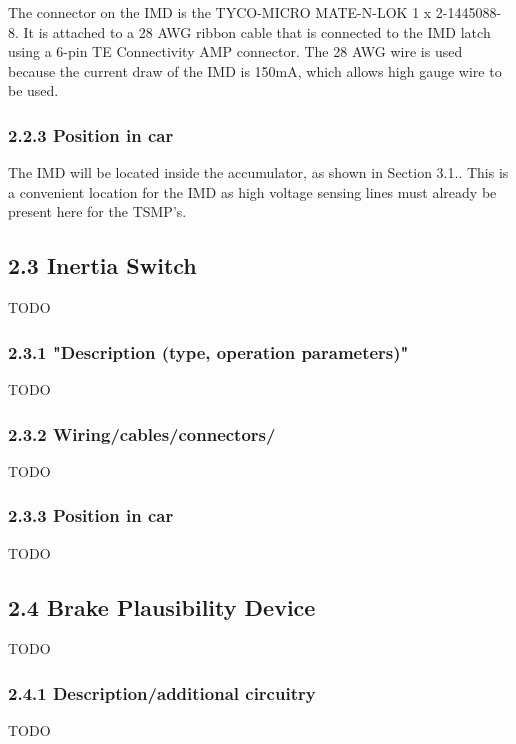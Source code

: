 \documentclass{article}
\begin{document}
The connector on the IMD is the TYCO-MICRO MATE-N-LOK 1 x 2-1445088-8. It is attached to a 28 AWG ribbon cable that is connected to the IMD latch using a 6-pin TE Connectivity AMP connector. The 28 AWG wire is used because the current draw of the IMD is 150mA, which allows high gauge wire to be used.



\subsubsection*{2.2.3 Position in car}

The IMD will be located inside the accumulator, as shown in Section 3.1.. This is a convenient location for the IMD as high voltage sensing lines must already be present here for the TSMP’s.


\subsection*{2.3 Inertia Switch}
TODO

\subsubsection*{2.3.1 "Description (type, operation parameters)"}
TODO

\subsubsection*{2.3.2 Wiring/cables/connectors/}
TODO

\subsubsection*{2.3.3 Position in car}
TODO

\subsection*{2.4 Brake Plausibility Device}
TODO

\subsubsection*{2.4.1 Description/additional circuitry}
TODO
\end{document}
